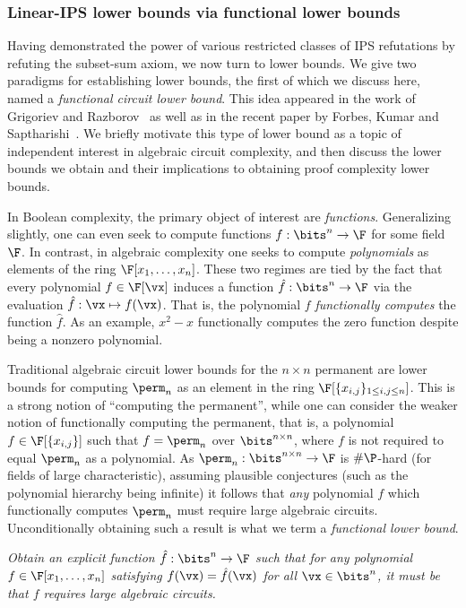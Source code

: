 \documentclass{toc}
\begin{document}
\subsubsection{Linear-IPS lower bounds via functional lower bounds}\label{sec:results:funct}

Having demonstrated the power of various restricted classes of IPS refutations by refuting the subset-sum axiom, we now turn to lower bounds.  We give two paradigms for establishing lower bounds, the first of which we discuss here, named a \emph{functional circuit lower bound}. This idea appeared in the work of Grigoriev and Razborov~\cite{GrigorievRazborov00} as well as in the recent paper by
Forbes, Kumar and Saptharishi~\cite{ForbesKS16}. We briefly motivate this type of lower bound as a topic of independent interest in algebraic circuit complexity, and then discuss the lower bounds we obtain and their implications to obtaining proof complexity lower bounds.

In Boolean complexity, the primary object of interest are \emph{functions}.  Generalizing slightly, one can even seek to compute functions $f:\bits^n\to\F$ for some field $\F$.  In contrast, in algebraic complexity one seeks to compute \emph{polynomials} as elements of the ring $\F[x_1,\ldots,x_n]$. These two regimes are tied by the fact that every polynomial $f\in\F[\vx]$ induces a function $\hat{f}:\bits^n\to \F$ via the evaluation $\hat{f}:\vx\mapsto f(\vx)$.  That is, the polynomial $f$ \emph{functionally computes} the function $\hat{f}$.  As an example, $x^2-x$ functionally computes the zero function despite being a nonzero polynomial.

Traditional algebraic circuit lower bounds for the $n\times n$ permanent are lower bounds for computing $\perm_n$ as an element in the ring $\F[\{x_{i,j}\}_{1\le i,j\le n}]$. This is a strong notion of ``computing the permanent'', while one can consider the weaker notion of functionally computing the permanent, that is, a polynomial $f\in\F[\{x_{i,j}\}]$ such that $f=\perm_n$ over $\bits^{n\times n}$, where $f$ is not required to equal $\perm_n$ as a polynomial.  As $\perm_n:\bits^{n\times n}\to\F$ is $\#\P$-hard (for fields of large characteristic), assuming plausible conjectures (such as the polynomial hierarchy being infinite) it follows that \emph{any} polynomial $f$ which functionally computes $\perm_n$ must require large algebraic circuits.  Unconditionally obtaining such a result is what we term a \emph{functional lower bound}.

\begin{goal}
\emph{Obtain an explicit function $\hat{f}:\bits^n\to\F$ such that for any polynomial $f\in\F[x_1,\ldots,x_n]$ satisfying $f(\vx)=\hat{f}(\vx)$ for all $\vx\in\bits^n$, it must be that $f$ requires large algebraic circuits.}
\end{goal}
\end{document}
